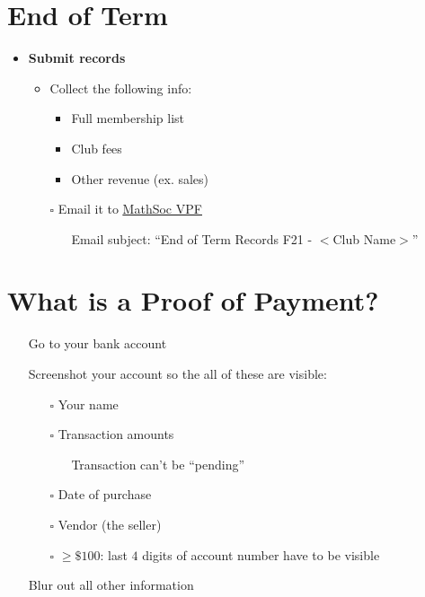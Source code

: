 \documentclass[utf8]{article}
\makeatletter
\newcommand{\termandyear}{F21 }
\renewcommand{\labelitemi}{$\square$}
\renewcommand\labelitemii{\textbullet}
\renewcommand\labelitemiii{$\square$}
\newcommand{\MathSocVPF}{\href{mailto:vpf@mathsoc.uwaterloo.ca}{\underline{MathSoc VPF} }}
\makeatother
\begin{document}
\renewcommand{\labelitemi}{$\square$}
\renewcommand\labelitemii{\textbullet}
\renewcommand\labelitemiii{$\square$}

\section*{End of Term}
\begin{itemize}
    \item \textbf{Submit records}
    \begin{itemize}
        \item Collect the following info: 
        \begin{itemize}
            \item Full membership list
            \item Club fees
            \item Other revenue (ex. sales)
        \end{itemize}
        \item[$\square$] Email it to \MathSocVPF
            \begin{itemize}
                \item[\textperiodcentered] Email subject: ``End of Term Records \termandyear - $<$Club Name$>$''
            \end{itemize}
    \end{itemize}
\end{itemize}

\section*{What is a Proof of Payment?}
\label{sec:pop}
\begin{itemize}
    \item[\textbullet] Go to your bank account
    \item[\textbullet] Screenshot your account so the all of these are visible:
    \begin{itemize}
        \item[$\square$] Your name 
        \item[$\square$] Transaction amounts
        \begin{itemize}
            \item[\textperiodcentered] Transaction can't be ``pending''
        \end{itemize} 
        \item[$\square$] Date of purchase
        \item[$\square$] Vendor (the seller) 
        \item[$\square$] $\geq \$100$: last $4$ digits of account number have to be visible
    \end{itemize}
    \item[\textbullet] Blur out all other information
\end{itemize}
\end{document}
